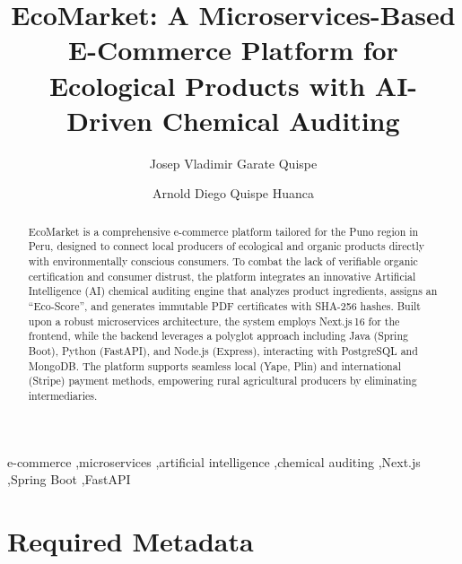 \documentclass[preprint,12pt,a4paper]{elsarticle}
\begin{document}
\renewcommand{\labelenumii}{\arabic{enumi}.\arabic{enumii}}

\begin{frontmatter}

\title{EcoMarket: A Microservices-Based E-Commerce Platform for Ecological Products with AI-Driven Chemical Auditing}

\author[unal]{Josep Vladimir Garate Quispe}

\author[unal]{Arnold Diego Quispe Huanca}


\address[unal]{Escuela Profesional de Ingeniería de Sistemas,
               Facultad de Ingeniería de Sistemas,
               Universidad Nacional del Altiplano,
               Puno, Peru}

\begin{abstract}
EcoMarket is a comprehensive e-commerce platform tailored for the Puno region in Peru, designed to connect local producers of ecological and organic products directly with environmentally conscious consumers. To combat the lack of verifiable organic certification and consumer distrust, the platform integrates an innovative Artificial Intelligence (AI) chemical auditing engine that analyzes product ingredients, assigns an ``Eco-Score'', and generates immutable PDF certificates with SHA-256 hashes. Built upon a robust microservices architecture, the system employs Next.js\,16 for the frontend, while the backend leverages a polyglot approach including Java (Spring Boot), Python (FastAPI), and Node.js (Express), interacting with PostgreSQL and MongoDB. The platform supports seamless local (Yape, Plin) and international (Stripe) payment methods, empowering rural agricultural producers by eliminating intermediaries.
\end{abstract}

\begin{keyword}
e-commerce \sep microservices \sep artificial intelligence \sep chemical auditing \sep Next.js \sep Spring Boot \sep FastAPI
\end{keyword}

\end{frontmatter}

\section*{Required Metadata}
\end{document}
